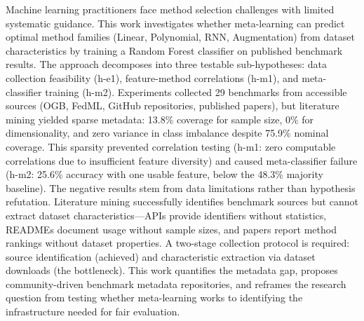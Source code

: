 
Machine learning practitioners face method selection challenges with limited systematic guidance. This work investigates whether meta-learning can predict optimal method families (Linear, Polynomial, RNN, Augmentation) from dataset characteristics by training a Random Forest classifier on published benchmark results. The approach decomposes into three testable sub-hypotheses: data collection feasibility (h-e1), feature-method correlations (h-m1), and meta-classifier training (h-m2). Experiments collected 29 benchmarks from accessible sources (OGB, FedML, GitHub repositories, published papers), but literature mining yielded sparse metadata: 13.8\% coverage for sample size, 0\% for dimensionality, and zero variance in class imbalance despite 75.9\% nominal coverage. This sparsity prevented correlation testing (h-m1: zero computable correlations due to insufficient feature diversity) and caused meta-classifier failure (h-m2: 25.6\% accuracy with one usable feature, below the 48.3\% majority baseline). The negative results stem from data limitations rather than hypothesis refutation. Literature mining successfully identifies benchmark sources but cannot extract dataset characteristics---APIs provide identifiers without statistics, READMEs document usage without sample sizes, and papers report method rankings without dataset properties. A two-stage collection protocol is required: source identification (achieved) and characteristic extraction via dataset downloads (the bottleneck). This work quantifies the metadata gap, proposes community-driven benchmark metadata repositories, and reframes the research question from testing whether meta-learning works to identifying the infrastructure needed for fair evaluation.

